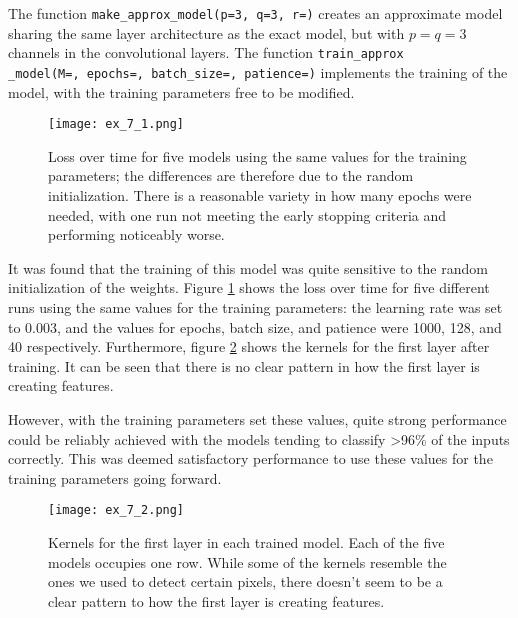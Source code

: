 \documentclass{somasmsc}
\begin{document}
\begin{exa}
The function \verb|make_approx_model(p=3, q=3, r=)| creates an approximate model sharing the same layer architecture as the exact model, but with $p=q=3$ channels in the convolutional layers. The function \verb|train_approx|\\ \verb|_model(M=, epochs=, batch_size=, patience=)| implements the training of the model, with the training parameters free to be modified.

\begin{figure}[H]\label{digit:ex_7_1}
\begin{center}
\texttt{[image: ex\_7\_1.png]}
\end{center}
\caption{Loss over time for five models using the same values for the training parameters; the differences are therefore due to the random initialization. There is a reasonable variety in how many epochs were needed, with one run not meeting the early stopping criteria and performing noticeably worse.}
\end{figure}

It was found that the training of this model was quite sensitive to the random initialization of the weights. Figure \ref{digit:ex_7_1} shows the loss over time for five different runs using the same values for the training parameters: the learning rate was set to 0.003, and the values for epochs, batch size, and patience were 1000, 128, and 40 respectively. Furthermore, figure \ref{digit:ex_7_2} shows the kernels for the first layer after training. It can be seen that there is no clear pattern in how the first layer is creating features.

However, with the training parameters set these values, quite strong performance could be reliably achieved with the models tending to classify >96\% of the inputs correctly. This was deemed satisfactory performance to use these values for the training parameters going forward.

\begin{figure}[H]\label{digit:ex_7_2}
\begin{center}
\texttt{[image: ex\_7\_2.png]}
\end{center}
\caption{Kernels for the first layer in each trained model. Each of the five models occupies one row. While some of the kernels resemble the ones we used to detect certain pixels, there doesn't seem to be a clear pattern to how the first layer is creating features.}
\end{figure}
\end{exa}
\end{document}
